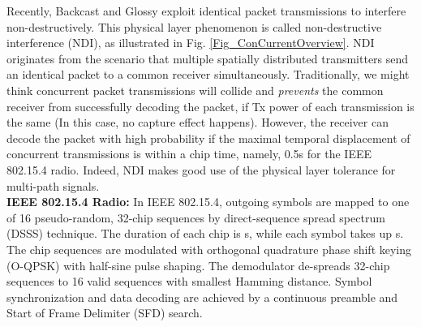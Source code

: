 \documentclass[conference]{IEEEtran}
\begin{document}
\indent Recently, Backcast \cite{DuttaSensys10Backcast} and Glossy \cite{ferrari11Glossy} exploit identical packet transmissions to interfere non-destructively.
This physical layer phenomenon is called non-destructive interference (NDI), as illustrated in Fig. \ref{Fig_ConCurrentOverview}.
NDI originates from the scenario that multiple spatially distributed transmitters send an identical packet to a common receiver simultaneously.
Traditionally, we might think concurrent packet transmissions will collide and \emph{prevents} the common receiver from successfully decoding the packet, if Tx power of each transmission is the same (In this case, no capture effect happens).
However, the receiver can decode the packet with high probability if the maximal temporal displacement of concurrent transmissions is within a chip time, namely, 0.5s for the IEEE 802.15.4 radio.
Indeed, NDI makes good use of the physical layer tolerance for multi-path signals.\\
\indent \textbf{IEEE 802.15.4 Radio:}
In IEEE 802.15.4, outgoing symbols are mapped to one of 16 pseudo-random, 32-chip sequences by direct-sequence spread spectrum (DSSS) technique.
The duration of each chip is s, while each symbol takes up s.
The chip sequences are modulated with orthogonal quadrature phase shift keying (O-QPSK) with half-sine pulse shaping.
The demodulator de-spreads 32-chip sequences to 16 valid sequences with smallest Hamming distance.
Symbol synchronization and data decoding are achieved by a continuous preamble and Start of Frame Delimiter (SFD) search.
\end{document}
